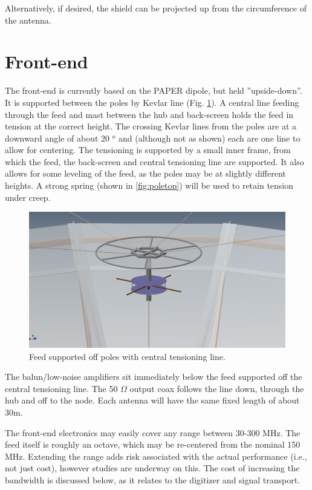 \documentclass[11pt]{article}
\begin{document}
Alternatively, if desired, the shield can be projected up from the circumference of the antenna.

\section{Front-end}
The front-end is currently based on the PAPER dipole, but held ''upside-down''.  It is supported between the poles by Kevlar line (Fig. \ref{fig:frontend}).  A central line feeding through the feed and mast between the hub and back-screen holds the feed in tension at the correct height.  The crossing Kevlar lines from the poles are at a downward angle of about 20 $^o$ and (although not as shown) each are one line to allow for centering.  The tensioning is supported by a small inner frame, from which the feed, the back-screen and central tensioning line are supported.  It also allows for some leveling of the feed, as the poles may be at slightly different heights.   A strong spring (shown in \ref{fig:poletop}) will be used to retain tension under creep.

\begin{figure}[H]
\centering
\includegraphics[width=\textwidth]{plots/frontend.png}
\caption{Feed supported off poles with central tensioning line.}
\label{fig:frontend}
\end{figure}

The balun/low-noise amplifiers sit immediately below the feed supported off the central tensioning line.  The 50 $\Omega$ output coax follows the line down, through the hub and off to the node.  Each antenna will have the same fixed length of about 30m.

The front-end electronics may easily cover any range between 30-300 MHz.  The feed itself is roughly an octave, which may be re-centered from the nominal 150 MHz.   Extending the range adds risk associated with the actual performance (i.e., not just cost), however studies are underway on this.  The cost of increasing the bandwidth is discussed below, as it relates to the digitizer and signal transport.
\end{document}
